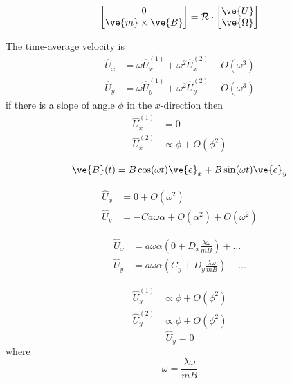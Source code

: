 \begin{equation}
    \begin{bmatrix} 0 \\ \ve{m}\times\ve{B} \end{bmatrix} = \mathcal{R} \cdot \begin{bmatrix} \ve{U} \\ \ve{\Omega} \end{bmatrix} \label{eq:dynamics}
\end{equation}

The time-average velocity is 
\begin{align}
    \hat{U}_x &= \omega \hat{U}_x^{(1)}+\omega^2 \hat {U}_x^{(2)} + O(\omega^3) 
    \\
    \hat{U}_y &= \omega \hat{U}_y^{(1)} + \omega^2 \hat {U}_y^{(2)} + O(\omega^3) 
\end{align}
if there is a slope of angle $\phi$ in the $x$-direction then
\begin{align}
    \hat{U}_x^{(1)} &= 0 
    \\
    \hat {U}_x^{(2)} &\propto \phi + O(\phi^2)
\end{align}

\begin{equation}
    \ve{B}(t) = B \cos(\omega t) \ve{e}_x + B \sin (\omega t) \ve{e}_y
\end{equation}

\begin{align}
    \hat{U}_x &= 0 + O(\omega^2) 
    \\
    \hat {U}_y &= - C a \omega \alpha + O(\alpha^2) + O(\omega^2) 
\end{align}

\begin{align}
    \hat{U}_x &= a\omega \alpha\left( 0  + D_x \frac{\lambda \omega}{m B}\right) + \dots
    \\
    \hat {U}_y &= a\omega \alpha\left(C_y  + D_y \frac{\lambda\omega}{m B} \right) + \dots
\end{align}

\begin{align}
    \hat{U}_y^{(1)} &\propto \phi + O(\phi^2) 
    \\
    \hat {U}_y^{(2)} &\propto \phi + O(\phi^2)
\end{align}
\begin{equation}
    \hat{U}_y = 0
\end{equation}
where 
\begin{equation}
    \omega = \frac{\lambda\omega}{m B}
\end{equation}


